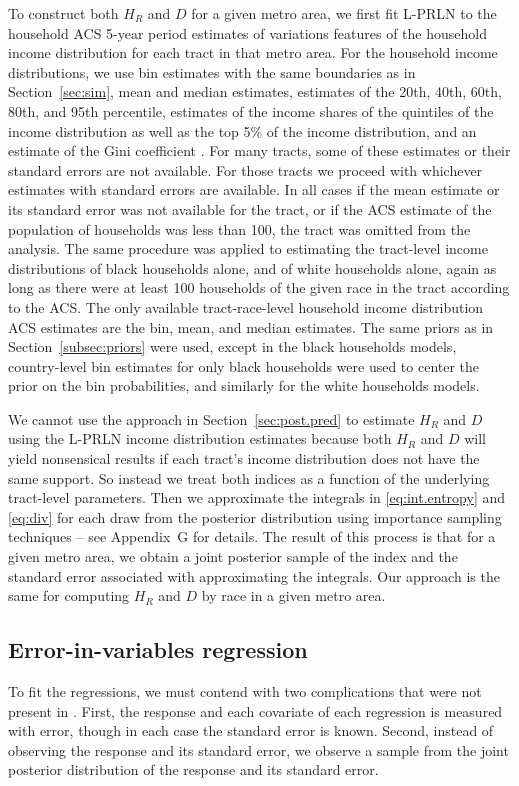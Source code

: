 \documentclass[12pt]{article}
\begin{document}
To construct both $H_R$ and $D$ for a given metro area, we first fit L-PRLN to the household ACS 5-year period estimates of variations features of the household income distribution for each tract in that metro area. For the household income distributions, we use bin estimates with the same boundaries as in Section~\ref{sec:sim}, mean and median estimates, estimates of the 20th, 40th, 60th, 80th, and 95th percentile, estimates of the income shares of the quintiles of the income distribution as well as the top 5\% of the income distribution, and an estimate of the Gini coefficient \citep{acs2018quintiles,acs2018shares,acs2018gini,acs2018income,acs2018financial}. For many tracts, some of these estimates or their standard errors are not available. For those tracts we proceed with whichever estimates with standard errors are available. In all cases if the mean estimate or its standard error was not available for the tract, or if the ACS estimate of the population of households was less than 100, the tract was omitted from the analysis. The same procedure was applied to estimating the tract-level income distributions of black households alone, and of white households alone, again as long as there were at least 100 households of the given race in the tract according to the ACS. The only available tract-race-level household income distribution ACS estimates are the bin, mean, and median estimates. The same priors as in Section~\ref{subsec:priors} were used, except in the black households models, country-level bin estimates for only black households were used to center the prior on the bin probabilities, and similarly for the white households models.

We cannot use the approach in Section~\ref{sec:post.pred} to estimate $H_R$ and $D$ using the L-PRLN income distribution estimates because both $H_R$ and $D$ will yield nonsensical results if each tract's income distribution does not have the same support. So instead we treat both indices as a function of the underlying tract-level parameters. Then we approximate the integrals in \eqref{eq:int.entropy} and \eqref{eq:div} for each draw from the posterior distribution using importance sampling techniques -- see Appendix~G %
 for details. The result of this process is that for a given metro area, we obtain a joint posterior sample of the index and the standard error associated with approximating the integrals. Our approach is the same for computing $H_R$ and $D$ by race in a given metro area.

\subsection{Error-in-variables regression}\label{sec:eiv}
To fit the regressions, we must contend with two complications that were not present in \citet{reardon2011income}. First, the response and each covariate of each regression is measured with error, though in each case the standard error is known. Second, instead of observing the response and its standard error, we observe a sample from the joint posterior distribution of the response and its standard error. 
\end{document}
